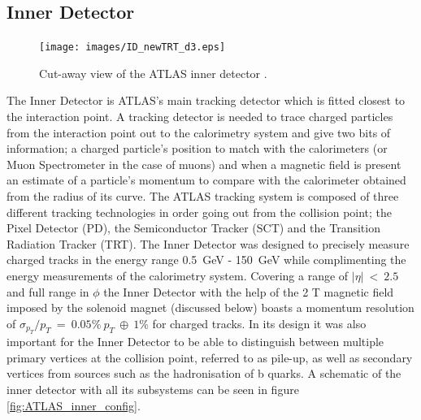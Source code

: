 	\subsection{Inner Detector}

		\begin{figure}[h!]
			\begin{center}
				\texttt{[image: images/ID\_newTRT\_d3.eps]}
			\end{center}
			\caption{Cut-away view of the ATLAS inner detector \cite{Aad:1129811}.}
			\label{fig:ATLAS_inner}
		\end{figure}

		The Inner Detector is ATLAS's main tracking detector which is fitted closest to the interaction point. A tracking detector is needed to trace charged particles from the interaction point out to the calorimetry system and give two bits of information; a charged particle's position to match with the calorimeters (or Muon Spectrometer in the case of muons) and when a magnetic field is present an estimate of a particle's momentum to compare with the calorimeter obtained from the radius of its curve. The  ATLAS tracking system is composed of three different tracking technologies in order going out from the collision point; the Pixel Detector (PD), the Semiconductor Tracker (SCT) and the Transition Radiation Tracker (TRT). The Inner Detector was designed to precisely measure charged tracks in the energy range 0.5~GeV - 150~GeV while complimenting the energy measurements of the calorimetry system. Covering a range of $|\eta|~<~2.5$ and full range in $\phi$ the Inner Detector with the help of the 2 T magnetic field imposed by the solenoid magnet (discussed below) boasts a momentum resolution of $\sigma_{p_{T}}/p_{T}~=~0.05\%~p_{T}~\oplus~1\%$ for charged tracks. In its design it was also important for the Inner Detector to be able to distinguish between multiple primary vertices at the collision point, referred to as pile-up, as well as secondary vertices from sources such as the hadronisation of b quarks. A schematic of the inner detector with all its subsystems can be seen in figure \ref{fig:ATLAS_inner_config}.

